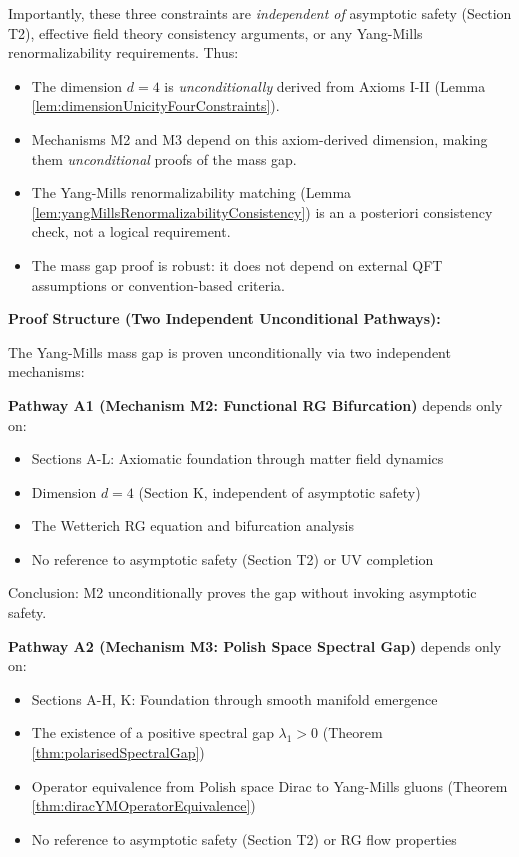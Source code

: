\begin{remark}
Importantly, these three constraints are \textit{independent of} asymptotic safety (Section T2), effective field theory consistency arguments, or any Yang-Mills renormalizability requirements. Thus:
\begin{itemize}
\item The dimension $d = 4$ is \textit{unconditionally} derived from Axioms I-II (Lemma \ref{lem:dimensionUnicityFourConstraints}).
\item Mechanisms M2 and M3 depend on this axiom-derived dimension, making them \textit{unconditional} proofs of the mass gap.
\item The Yang-Mills renormalizability matching (Lemma \ref{lem:yangMillsRenormalizabilityConsistency}) is an a posteriori consistency check, not a logical requirement.
\item The mass gap proof is robust: it does not depend on external QFT assumptions or convention-based criteria.
\end{itemize}

\textbf{Proof Structure (Two Independent Unconditional Pathways):}

The Yang-Mills mass gap is proven unconditionally via two independent mechanisms:

\textbf{Pathway A1 (Mechanism M2: Functional RG Bifurcation)} depends only on:
\begin{itemize}
\item Sections A-L: Axiomatic foundation through matter field dynamics
\item Dimension $d = 4$ (Section K, independent of asymptotic safety)
\item The Wetterich RG equation and bifurcation analysis
\item No reference to asymptotic safety (Section T2) or UV completion
\end{itemize}

Conclusion: M2 unconditionally proves the gap without invoking asymptotic safety.

\textbf{Pathway A2 (Mechanism M3: Polish Space Spectral Gap)} depends only on:
\begin{itemize}
\item Sections A-H, K: Foundation through smooth manifold emergence
\item The existence of a positive spectral gap $\lambda_1 > 0$ (Theorem \ref{thm:polarisedSpectralGap})
\item Operator equivalence from Polish space Dirac to Yang-Mills gluons (Theorem \ref{thm:diracYMOperatorEquivalence})
\item No reference to asymptotic safety (Section T2) or RG flow properties
\end{itemize}


\end{remark}
